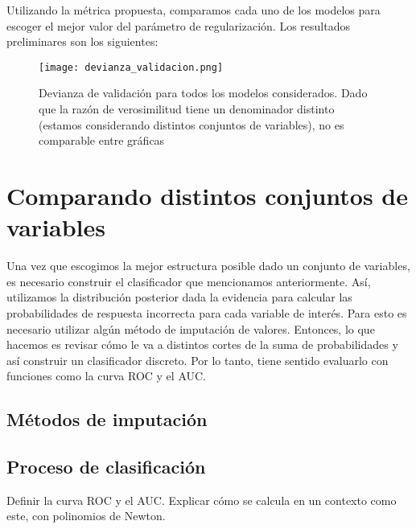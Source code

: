 Utilizando la métrica propuesta, comparamos cada uno de los modelos para escoger el mejor valor del parámetro de regularización. Los resultados preliminares son los siguientes:
\begin{figure}[h]
    \caption{Devianza de validación para todos los modelos considerados. Dado que la razón de verosimilitud tiene un denominador distinto (estamos considerando distintos conjuntos de variables), no es comparable entre gráficas}
    \texttt{[image: devianza\_validacion.png]}
\end{figure}
\section*{Comparando distintos conjuntos de variables}
Una vez que escogimos la mejor estructura posible dado un conjunto de variables, es necesario construir el clasificador que mencionamos anteriormente. Así, utilizamos la distribución posterior dada la evidencia para calcular las probabilidades de respuesta incorrecta para cada variable de interés. Para esto es necesario utilizar algún método de imputación de valores.
Entonces, lo que hacemos es revisar cómo le va a distintos cortes de la suma de probabilidades y así construir un clasificador discreto. Por lo tanto, tiene sentido evaluarlo con funciones como la curva ROC y el AUC.
\subsection*{Métodos de imputación}
\subsection*{Proceso de clasificación}
Definir la curva ROC y el AUC. Explicar cómo se calcula en un contexto como este, con polinomios de Newton.

